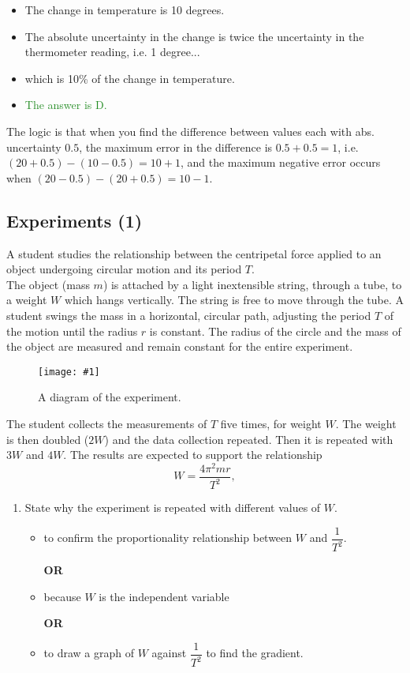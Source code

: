 \documentclass[a4paper,12pt]{article}
\let\oldsubsection\subsection
\renewcommand\subsection{\clearpage\oldsubsection}
\newcommand{\lb}{\\[8pt]}
\newcommand{\img}[4]{\begin{center}
  \begin{figure}[H]
    \centering
    \texttt{[image: \#1]}
    \caption{#3}
    \label{fig:#4}
  \end{figure}
\end{center}}
\newcommand{\ans}[1]{\textcolor{ForestGreen}{The answer is #1.}}
\begin{document}
\begin{itemize}
  \item The change in temperature is 10 degrees.
  \item The absolute uncertainty in the change is twice the uncertainty in the thermometer reading, i.e. 1 degree...
  \item which is 10\% of the change in temperature.
  \item \ans{D}
\end{itemize}

The logic is that when you find the difference between values each with abs. uncertainty $0.5$, the maximum error in the difference is $0.5 + 0.5 = 1$, i.e. $(20 + 0.5) - (10 - 0.5) = 10 + 1$, and the maximum negative error occurs when $(20 - 0.5) - (20 + 0.5) = 10 - 1$.

\subsection{Experiments (1)}

A student studies the relationship between the centripetal force applied to an object undergoing circular motion and its period \( T \).\lb
The object (mass \( m \)) is attached by a light inextensible string, through a tube, to a weight $W$ which hangs vertically. The string is free to move through the tube. A student swings the mass in a horizontal, circular path, adjusting the period $T$ of the motion until the radius \( r \) is constant. The radius of the circle and the mass of the object are measured and remain constant for the entire experiment.

\img{ex/6.png}{0.7}{A diagram of the experiment.}{6}


The student collects the measurements of $T$ five times, for weight \( W \). The weight is then doubled (\( 2W \)) and the data collection repeated. Then it is repeated with \( 3W \) and \( 4W \). The results are expected to support the relationship
\[ W = \frac{4\pi^2mr}{T^2}, \]

\begin{enumerate}[label=(\alph*)]
  \item State why the experiment is repeated with different values of $W$.
        \begin{itemize}
          \item to confirm the proportionality relationship between $W$ and $\dfrac{1}{T^2}$.

                \textbf{OR}

          \item because $W$ is the independent variable




                \textbf{OR}

          \item to draw a graph of $W$ against $\dfrac{1}{T^2}$ to find the gradient.



        \end{itemize}
\end{enumerate}
\end{document}
